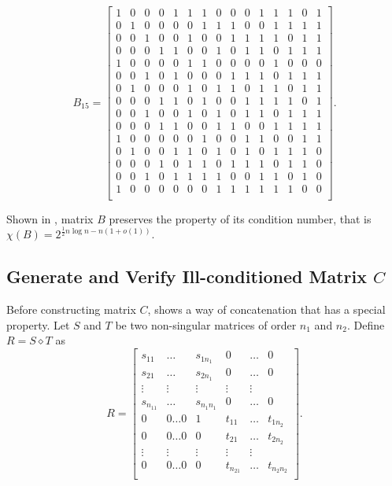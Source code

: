 \documentclass[11pt]{article}
\begin{document}
$$B_{15}=
\left[\begin{smallmatrix}
    1 & 0 & 0 & 0 & 1 & 1 & 1 & 0 & 0 & 0 & 1 & 1 & 1 & 0 & 1 \\
    0 & 1 & 0 & 0 & 0 & 0 & 1 & 1 & 1 & 0 & 0 & 1 & 1 & 1 & 1 \\
    0 & 0 & 1 & 0 & 0 & 1 & 0 & 0 & 1 & 1 & 1 & 1 & 0 & 1 & 1 \\
    0 & 0 & 0 & 1 & 1 & 0 & 0 & 1 & 0 & 1 & 1 & 0 & 1 & 1 & 1 \\
    1 & 0 & 0 & 0 & 0 & 1 & 1 & 0 & 0 & 0 & 0 & 1 & 0 & 0 & 0 \\
    0 & 0 & 1 & 0 & 1 & 0 & 0 & 0 & 1 & 1 & 1 & 0 & 1 & 1 & 1 \\
    0 & 1 & 0 & 0 & 0 & 1 & 0 & 1 & 1 & 0 & 1 & 1 & 0 & 1 & 1 \\
    0 & 0 & 0 & 1 & 1 & 0 & 1 & 0 & 0 & 1 & 1 & 1 & 1 & 0 & 1 \\
    0 & 0 & 1 & 0 & 0 & 1 & 0 & 1 & 0 & 1 & 1 & 0 & 1 & 1 & 1 \\
    0 & 0 & 0 & 1 & 1 & 0 & 0 & 1 & 1 & 0 & 0 & 1 & 1 & 1 & 1 \\
    1 & 0 & 0 & 0 & 0 & 0 & 1 & 0 & 0 & 1 & 1 & 0 & 0 & 1 & 1 \\
    0 & 1 & 0 & 0 & 1 & 1 & 0 & 1 & 0 & 1 & 0 & 1 & 1 & 1 & 0 \\
    0 & 0 & 0 & 1 & 0 & 1 & 1 & 0 & 1 & 1 & 1 & 0 & 1 & 1 & 0 \\
    0 & 0 & 1 & 0 & 1 & 1 & 1 & 1 & 0 & 0 & 1 & 1 & 0 & 1 & 0 \\
    1 & 0 & 0 & 0 & 0 & 0 & 0 & 1 & 1 & 1 & 1 & 1 & 1 & 0 & 0 \\
\end{smallmatrix}\right].
$$

Shown in \cite{ALON1997133}, matrix $B$ preserves the property of its condition number, that is $\chi(B)=2^{\frac{1}{2}n\log n-n(1+o(1))}$.

\subsection{Generate and Verify Ill-conditioned Matrix $C$}\label{section2.4}
Before constructing matrix $C$, \cite{ALON1997133} shows a way of concatenation that has a special property. Let $S$ and $T$ be two non-singular matrices of order $n_1$ and $n_2$. Define $R = S \diamond T$ as
$$R=
\left[\begin{smallmatrix}
    s_{11} & \dots & s_{1n_1} & 0 & \dots  & 0 \\
    s_{21} & \dots & s_{2n_1} & 0 & \dots  & 0 \\
    \vdots & \vdots & \vdots & \vdots & \vdots \\
    s_{n_11} & \dots & s_{n_1n_1} & 0 & \dots  & 0 \\
    0 & 0 \dots 0 & 1 & t_{11} & \dots & t_{1n_2} \\
    0 & 0 \dots 0 & 0 & t_{21} & \dots & t_{2n_2} \\
    \vdots & \vdots & \vdots & \vdots & \vdots \\
    0 & 0 \dots 0 & 0 & t_{n_21} & \dots & t_{n_2n_2} \\
\end{smallmatrix}\right].
$$
\end{document}
